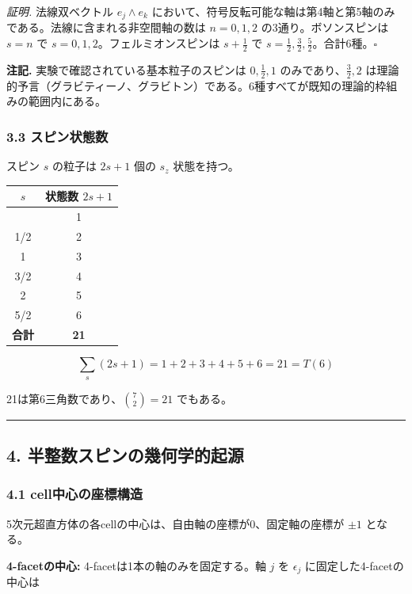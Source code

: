 \documentclass[a4paper,11pt]{ltjsarticle}
\newcounter{none}
\begin{document}
\emph{証明.} 法線双ベクトル $e_j \wedge e_k$ において、符号反転可能な軸は第4軸と第5軸のみである。法線に含まれる非空間軸の数は $n = 0, 1, 2$ の3通り。ボソンスピンは $s = n$ で $s = 0, 1, 2$。フェルミオンスピンは $s + \frac{1}{2}$ で $s = \frac{1}{2}, \frac{3}{2}, \frac{5}{2}$。合計6種。$\square$

\textbf{注記.} 実験で確認されている基本粒子のスピンは $0, \frac{1}{2}, 1$ のみであり、$\frac{3}{2}, 2$ は理論的予言（グラビティーノ、グラビトン）である。6種すべてが既知の理論的枠組みの範囲内にある。

\subsubsection*{3.3 スピン状態数}

スピン $s$ の粒子は $2s + 1$ 個の $s_z$ 状態を持つ。

{\def\LTcaptype{none}
\begin{longtable}[]{@{}cc@{}}
\toprule
$s$ & 状態数 $2s+1$ \\
\midrule
\endhead
\bottomrule
\endlastfoot
0 & 1 \\
1/2 & 2 \\
1 & 3 \\
3/2 & 4 \\
2 & 5 \\
5/2 & 6 \\
\textbf{合計} & \textbf{21} \\
\end{longtable}
}

\[\sum_{s} (2s+1) = 1 + 2 + 3 + 4 + 5 + 6 = 21 = T(6)\]

21は第6三角数であり、$\binom{7}{2} = 21$ でもある。

\begin{center}\rule{0.5\linewidth}{0.5pt}\end{center}

\subsection*{4. 半整数スピンの幾何学的起源}

\subsubsection*{4.1 cell中心の座標構造}

5次元超直方体の各cellの中心は、自由軸の座標が0、固定軸の座標が $\pm 1$ となる。

\textbf{4-facetの中心:} 4-facetは1本の軸のみを固定する。軸 $j$ を $\epsilon_j$ に固定した4-facetの中心は
\end{document}
